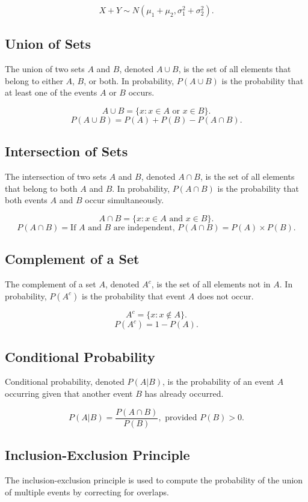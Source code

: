 \documentclass[12pt]{article}
\begin{document}
\[
X + Y \sim N(\mu_1 + \mu_2, \sigma_1^2 + \sigma_2^2).
\]

\subsection*{Union of Sets}
The union of two sets $A$ and $B$, denoted $A \cup B$, is the set of all elements that belong to either $A$, $B$, or both. In probability, $P(A \cup B)$ is the probability that at least one of the events $A$ or $B$ occurs.

\[
A \cup B = \{x : x \in A \text{ or } x \in B\}.
\]
\[
P(A \cup B) = P(A) + P(B) - P(A \cap B).
\]

\subsection*{Intersection of Sets}
The intersection of two sets $A$ and $B$, denoted $A \cap B$, is the set of all elements that belong to both $A$ and $B$. In probability, $P(A \cap B)$ is the probability that both events $A$ and $B$ occur simultaneously.

\[
A \cap B = \{x : x \in A \text{ and } x \in B\}.
\]
\[
P(A \cap B) = \text{If } A \text{ and } B \text{ are independent, } P(A \cap B) = P(A) \times P(B).
\]

\subsection*{Complement of a Set}
The complement of a set $A$, denoted $A^c$, is the set of all elements not in $A$. In probability, $P(A^c)$ is the probability that event $A$ does not occur.

\[
A^c = \{x : x \notin A\}.
\]
\[
P(A^c) = 1 - P(A).
\]

\subsection*{Conditional Probability}
Conditional probability, denoted $P(A | B)$, is the probability of an event $A$ occurring given that another event $B$ has already occurred.

\[
P(A | B) = \frac{P(A \cap B)}{P(B)}, \text{ provided } P(B) > 0.
\]


\subsection*{Inclusion-Exclusion Principle}
The inclusion-exclusion principle is used to compute the probability of the union of multiple events by correcting for overlaps.
\end{document}
